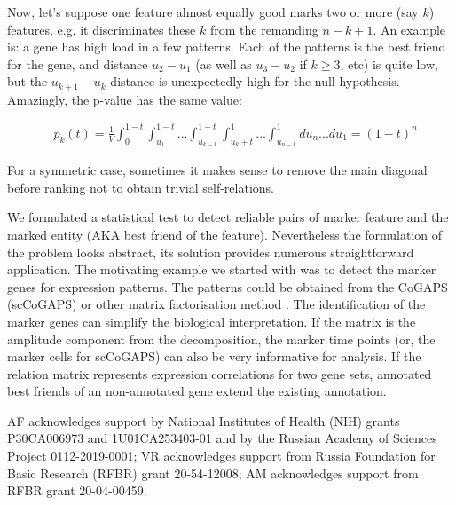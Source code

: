 \documentclass[12pt]{article}
\begin{document}
Now, let's suppose one feature almost equally good marks two or more (say $k$) features, e.g. it discriminates these $k$ from the remanding $n-k+1$. An example is: a gene has high load in a few  patterns. Each of the patterns is the best friend for the gene, and distance $u_2-u_1$ (as well as $u_3-u_2$ if $k \ge 3$, etc) is quite low, but the $u_{k+1}-u_k$ distance is unexpectedly high for the null hypothesis. Amazingly, the p-value has the same value:

\begin{eqnarray*}
& p_k(t) = \displaystyle \frac{1}{V}\displaystyle \int_0^{1-t}\int_{{u_1}}^{1-t}...\int_{u_{k-1}}^{1-t}\int_{u_k+t}^1...\int_{u_{n-1}}^1 du_n... du_1 =  (1-t)^n \label{eq:p_k}
\end{eqnarray*}


For a symmetric case, sometimes it makes sense to remove the main diagonal before ranking not to obtain trivial self-relations.



We formulated a statistical test to detect reliable pairs of marker feature and the marked entity (AKA best friend of the feature). Nevertheless the formulation of the problem looks abstract, its solution provides numerous straightforward application. The motivating example we started with was to detect the marker genes for expression patterns. The patterns could be obtained from the CoGAPS (scCoGAPS) \cite{Fertig_2016} or other matrix factorisation method \cite{Stein_2018}. The identification of the marker genes can simplify the biological interpretation. If the matrix is the amplitude component from  the decomposition, the marker time points (or, the marker cells for scCoGAPS) can also be very informative for analysis. If the relation matrix represents expression correlations for two gene sets, annotated best friends of an non-annotated gene extend the existing annotation.

AF acknowledges support by National Institutes of Health (NIH) grants P30CA006973 and 1U01CA253403-01 and by the Russian Academy of Sciences Project 0112-2019-0001; VR acknowledges support from Russia Foundation for Basic Research (RFBR) grant 20-54-12008; AM acknowledges support from RFBR grant 20-04-00459.
\end{document}
